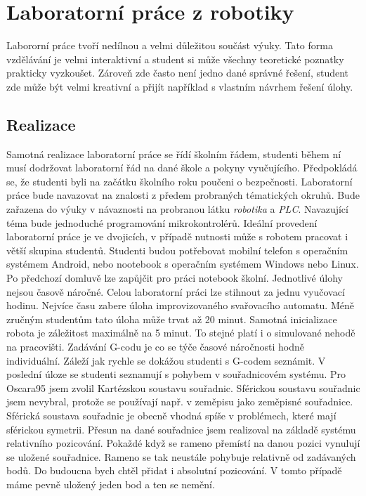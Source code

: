 \chapter{Laboratorní práce z robotiky}

Labororní práce tvoří nedílnou a velmi důležitou součást výuky. 
Tato forma vzdělávání je velmi interaktivní a student si může všechny teoretické poznatky prakticky vyzkoušet. Zároveň zde často není jedno dané správné řešení, student zde může být velmi kreativní a přijít například s vlastním návrhem řešení úlohy.

\section{Realizace}
Samotná realizace laboratorní práce se řídí školním řádem, studenti během ní musí dodržovat laboratorní řád na dané škole a pokyny vyučujícího. Předpoklá\-dá se, že studenti byli na začátku školního roku poučeni o bezpečnosti. Laboratorní práce bude navazovat na znalosti z předem probraných tématických okruhů. 
Bude zařazena do výuky v návaznosti na probranou látku \textit{robotika} a \textit{PLC}. Navazující téma bude jednoduché programování mikrokontrolérů. Ideální provedení laboratorní práce je ve dvojicích, v případě nutnosti může s robotem pracovat i větší skupina studentů. Studenti budou potřebovat mobilní telefon s operačním systémem Android, nebo nootebook s operačním systémem Windows nebo Linux. Po předchozí domluvě lze zapůjčit pro práci notebook školní. Jednotlivé úlohy nejsou časově náročné. Celou laboratorní práci lze stihnout za jednu vyučovací hodinu. Nejvíce času zabere úloha improvizovaného svařovacího automatu. Méně zručným studentům tato úloha může trvat až 20 minut. Samotná inicializace robota je záležitost maximálně na 5 minut. To stejné platí i o simulované nehodě na pracovišti. Zadávání G-codu je co se týče časové náročnosti hodně individuální. Záleží jak rychle se dokážou studenti s G-codem seznámit. V poslední úloze se studenti seznamují s pohybem v souřadnicovém systému. Pro Oscara95 jsem zvolil Kartézskou soustavu souřadnic. Sférickou soustavu souřadnic jsem nevybral, protože se používají např. v zeměpisu jako zeměpisné souřadnice. Sférická soustava souřadnic je obecně vhodná spíše v problémech, které mají sférickou symetrii. Přesun na dané souřadnice jsem realizoval na základě systému relativního pozicování. Pokaždé když se rameno přemístí na danou pozici vynulují se uložené souřadnice. Rameno se tak neustále pohybuje relativně od zadávaných bodů. Do budoucna bych chtěl přidat i absolutní pozicování. V tomto případě máme pevně uložený jeden bod a ten se nemění. \cite{Kartezske-wiki} \cite{Sfericke-wiki}

